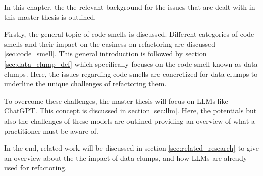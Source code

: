 

In this chapter, the the relevant background for the issues that are dealt with in this master thesis is outlined. 

Firstly, the general topic of code smells is discussed. Different categories of code smells and their impact on the easiness on refactoring are discussed  \ref{sec:code_smell}. This general introduction is followed by  section \ref{sec:data_clump_def} which  specifically focuses on the code smell known as data clumps. Here, the issues regarding code smells  are concretized for data clumps to underline the unique challenges of refactoring them.

To overcome these challenges, the master thesis will focus on \acp{LLM} like ChatGPT. This concept is discussed in section \ref{sec:llm}. Here, the potentials but also the challenges of these models are outlined providing an overview of what a practitioner must be aware of.

In the end, related work  will be discussed in section \ref{sec:related_research} to give an overview about the the impact of data clumps, and how \acp{LLM} are already used for refactoring. 








\begin{comment}
\section{Related work}
Since refactoring code smells is becoming increasingly important for developers, a variety of research has been conducted to study how the refactoring process can be improved.

Furthermore, tools have been developed that on their own cannot refactor code smells but can be adapted and used to ease developing refactoring tools.

Additionally, the use of \ac{LLM} in software development has recently gained widespread attention and has become a focus of several studies which analyzes the potential and challenges in practice. 

\subsection{Tools to assists data clump refactoring}





\end{comment}
